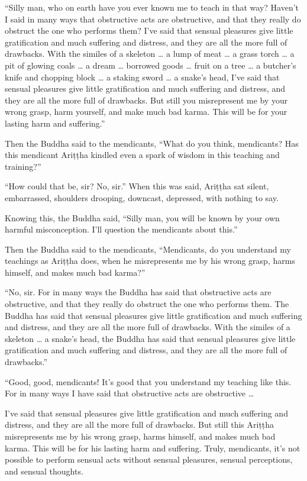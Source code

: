 \documentclass[12pt,openany]{book}%
\begin{document}
“Silly man, who on earth have you ever known me to teach in that way? Haven’t I said in many ways that obstructive acts are obstructive, and that they really do obstruct the one who performs them? I’ve said that sensual pleasures give little gratification and much suffering and distress, and they are all the more full of drawbacks. With the similes of a skeleton … a lump of meat … a grass torch … a pit of glowing coals … a dream … borrowed goods … fruit on a tree … a butcher’s knife and chopping block … a staking sword … a snake’s head, I’ve said that sensual pleasures give little gratification and much suffering and distress, and they are all the more full of drawbacks. But still you misrepresent me by your wrong grasp, harm yourself, and make much bad karma. This will be for your lasting harm and suffering.” 

Then the Buddha said to the mendicants, “What do you think, mendicants? Has this mendicant \textsanskrit{Ariṭṭha} kindled even a spark of wisdom in this teaching and training?” 

“How could that be, sir? No, sir.” When this was said, \textsanskrit{Ariṭṭha} sat silent, embarrassed, shoulders drooping, downcast, depressed, with nothing to say. 

Knowing this, the Buddha said, “Silly man, you will be known by your own harmful misconception. I’ll question the mendicants about this.” 

Then the Buddha said to the mendicants, “Mendicants, do you understand my teachings as \textsanskrit{Ariṭṭha} does, when he misrepresents me by his wrong grasp, harms himself, and makes much bad karma?” 

“No, sir. For in many ways the Buddha has said that obstructive acts are obstructive, and that they really do obstruct the one who performs them. The Buddha has said that sensual pleasures give little gratification and much suffering and distress, and they are all the more full of drawbacks. With the similes of a skeleton … a snake’s head, the Buddha has said that sensual pleasures give little gratification and much suffering and distress, and they are all the more full of drawbacks.” 

“Good, good, mendicants! It’s good that you understand my teaching like this. For in many ways I have said that obstructive acts are obstructive … 

I’ve said that sensual pleasures give little gratification and much suffering and distress, and they are all the more full of drawbacks. But still this \textsanskrit{Ariṭṭha} misrepresents me by his wrong grasp, harms himself, and makes much bad karma. This will be for his lasting harm and suffering. Truly, mendicants, it’s not possible to perform sensual acts without sensual pleasures, sensual perceptions, and sensual thoughts. 
\end{document}
